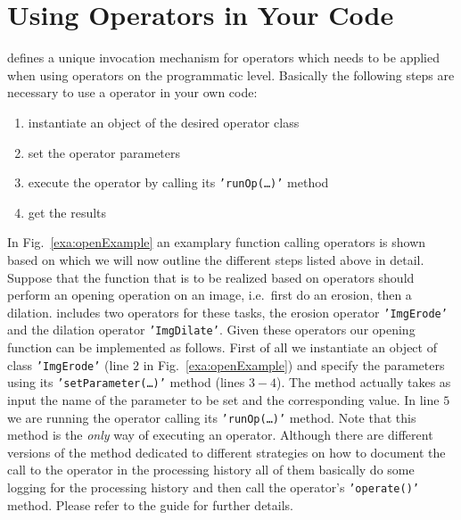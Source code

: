 \section{Using Operators in Your Code}
\label{sec:callOp}
\alida defines a unique invocation mechanism for operators which needs to be applied when using
operators on the programmatic level. Basically the following steps are necessary to use a \mitobo
operator in your own code:
\begin{enumerate}
  \item instantiate an object of the desired operator class
  \item set the operator parameters
  \item execute the operator by calling its {\tt 'runOp(\ldots)'} method
  \item get the results
\end{enumerate}

\begin{figure*}[tbp]
\centering

\caption{\label{exa:openExample}Example of a hypothetical function applying an opening to an 
image which is implemented based on \mitobo operators for morphological operations.}
\end{figure*}
In Fig.~\ref{exa:openExample} an examplary function calling \mitobo operators is shown based on 
which we will now outline the different steps listed above in detail. Suppose that the function 
that is to be realized based on \mitobo operators should perform an opening operation on an image,
i.e.~first do an erosion, then a dilation. \mitobo includes two operators for these tasks, the
erosion operator {\tt 'ImgErode'} and the dilation operator {\tt 'ImgDilate'}. Given these 
operators our opening function can be implemented as follows. First of all we instantiate an 
object of class {\tt 'ImgErode'} (line $2$ in Fig.~\ref{exa:openExample}) and specify the 
parameters using its {\tt 'setParameter(\ldots)'} method (lines $3-4$). 
The method actually takes as input the name of
the parameter to be set and the corresponding value. In line $5$ we are running the operator 
calling its {\tt 'runOp(\ldots)'} method. Note that this method is the {\em only} way of 
executing an operator. Although there are different versions of the method dedicated
to different strategies on how to document the call to the operator in the processing history
all of them basically do some logging for the processing history and then call the operator's
{\tt 'operate()'} method. Please refer to the \alida guide for further details. 

